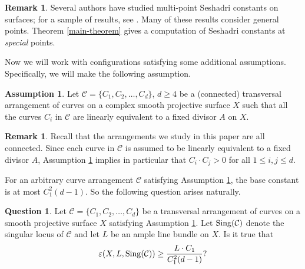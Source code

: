 \documentclass[12pt,reqno]{amsart}
\theoremstyle{plain}
\numberwithin{equation}{section}
\theoremstyle{definition}
\newtheorem{question}[theorem]{Question}
\newtheorem{remark}[theorem]{Remark}
\newtheorem{assumption}[theorem]{Assumption}
\begin{document}
\begin{remark}
Several authors have studied multi-point Seshadri constants on surfaces; for a sample of results, see \cite{B,HM, HR, PR, RR, SS}. 
Many of these results consider general points. 
Theorem \ref{main-theorem} gives a computation of Seshadri constants at \textit{special} points. 
\end{remark}


Now we will work with configurations satisfying some additional assumptions. Specifically, we will make the following assumption. 

	\begin{assumption}\label{star1}
		Let $\mathcal{C}=\{C_1,C_2, \ldots ,C_d\}$, $d\geq 4$ be a (connected) 
  transversal arrangement of curves 
		on a complex smooth projective surface $X$ such that all the curves 
  $C_i$ in $\mathcal{C}$ are linearly equivalent to a
			fixed divisor $A$ on $X$.
	\end{assumption}

 \begin{remark} 
Recall that the arrangements we study in this paper are all connected. Since each curve in $\mathcal{C}$ is assumed to be linearly equivalent to a fixed divisor $A$, 
Assumption \ref{star1} implies in particular that $C_i\cdot C_j > 0$ for all $1\le i,j \le d$.  
 \end{remark}
	




For an arbitrary curve arrangement $\mathcal{C}$ satisfying Assumption \ref{star1}, the base constant is at most 
$C_1^2(d-1)$. So the following question arises naturally. 

	\begin{question}\label{QuestM}
		Let $\mathcal{C} =\{C_1,C_2, \ldots ,C_d\}$ be a transversal arrangement of curves on a smooth projective surface $X$
		satisfying Assumption \ref{star1}. Let  ${\rm Sing}(\mathcal{C})$ denote the singular locus of $\mathcal{C}$ and let $L$ be an ample line bundle on $X$. Is it true that
		\begin{equation}\label{ques}
			\varepsilon(X, L,{\rm Sing}(\mathcal{C})) \geq \frac{L \cdot C_1}{C_1^2(d-1)} ?	
		\end{equation}	
		
	\end{question}	
	
\end{document}
